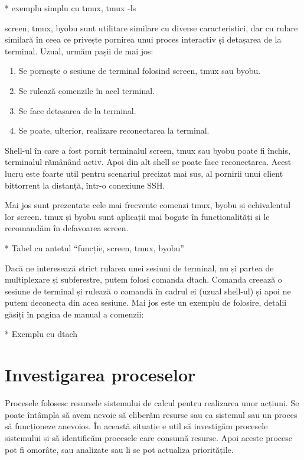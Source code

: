 * exemplu simplu cu tmux, tmux -ls

screen, tmux, byobu sunt utilitare similare cu diverse caracteristici, dar cu
rulare similară în ceea ce privește pornirea unui proces interactiv și detașarea
de la terminal. Uzual, urmăm pașii de mai jos:

\begin{enumerate}
	\item Se pornește o sesiune de terminal folosind screen, tmux sau byobu.
	\item Se rulează comenzile în acel terminal.
	\item Se face detașarea de la terminal.
	\item Se poate, ulterior, realizare reconectarea la terminal.
\end{enumerate}

Shell-ul în care a fost pornit terminalul screen, tmux sau byobu poate fi
închis, terminalul rămânând activ. Apoi din alt shell se poate face
reconectarea. Acest lucru este foarte util pentru scenariul precizat mai sus, al
pornirii unui client bittorrent la distanță, într-o conexiune SSH.

Mai jos sunt prezentate cele mai frecvente comenzi tmux, byobu și echivalentul
lor screen. tmux și byobu sunt aplicații mai bogate în funcționalități și le
recomandăm în defavoarea screen.

* Tabel cu antetul “funcție, screen, tmux, byobu”

Dacă ne interesează strict rularea unei sesiuni de terminal, nu și partea de
multiplexare și subferestre, putem folosi comanda dtach. Comanda creează o
sesiune de terminal și rulează o comandă în cadrul ei (uzual shell-ul) și apoi
ne putem deconecta din acea sesiune. Mai jos este un exemplu de folosire,
detalii găsiți în pagina de manual a comenzii:

* Exemplu cu dtach

\section{Investigarea proceselor}

Procesele folosesc resursele sistemului de calcul pentru realizarea unor
acțiuni. Se poate întâmpla să avem nevoie să eliberăm resurse sau ca sistemul
sau un proces să funcționeze anevoios. În această situație e util să investigăm
procesele sistemului și să identificăm procesele care consumă resurse. Apoi
aceste procese pot fi omorâte, sau analizate sau li se pot actualiza
prioritățile.

